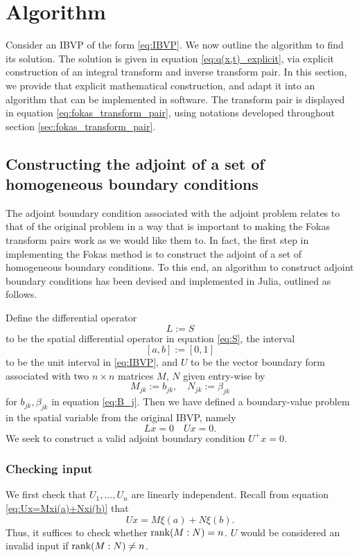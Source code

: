 \documentclass[12pt, oneside, a4paper]{article}
\begin{document}
\section{Algorithm}

Consider an IBVP of the form \eqref{eq:IBVP}. We now outline the algorithm to find its solution. The solution is given in equation \eqref{eq:q(x,t)_explicit}, via explicit construction of an integral transform and inverse transform pair. In this section, we provide that explicit mathematical construction, and adapt it into an algorithm that can be implemented in software. The transform pair is displayed in equation \eqref{eq:fokas_transform_pair}, using notations developed throughout section \ref{sec:fokas_transform_pair}.

\subsection{Constructing the adjoint of a set of homogeneous boundary conditions}\label{sec:construct_adjoint}

The adjoint boundary condition associated with the adjoint problem relates to that of the original problem in a way that is important to making the Fokas transform pairs work as we would like them to. In fact, the first step in implementing the Fokas method is to construct the adjoint of a set of homogeneous boundary conditions. To this end, an algorithm to construct adjoint boundary conditions has been devised and implemented in Julia, outlined as follows.

Define the differential operator 
\[L := S\]
to be the spatial differential operator in equation \eqref{eq:S},
the interval 
\[[a,b] := [0,1]\]
to be the unit interval in \eqref{eq:IBVP}, and $U$ to be the vector boundary form associated with two $n\times n$ matrices $M$, $N$ given entry-wise by 
\[M_{jk} := b_{jk},\quad N_{jk} := \beta_{jk}\]
for $b_{jk}, \beta_{jk}$ in equation \eqref{eq:B_j}.
Then we have defined a boundary-value problem in the spatial variable from the original IBVP, namely
\[Lx=0\quad Ux=0.\]
We seek to construct a valid adjoint boundary condition $U^+x=0$.

\subsubsection{Checking input}
We first check that $U_1,\ldots, U_n$ are linearly independent. Recall from equation \eqref{eq:Ux=Mxi(a)+Nxi(b)} that
\[Ux = M\xi(a) + N\xi(b).\]
Thus, it suffices to check whether $\operatorname{rank}(M:N)=n$. $U$ would be considered an invalid input if $\operatorname{rank}(M:N)\neq n$.
\end{document}
